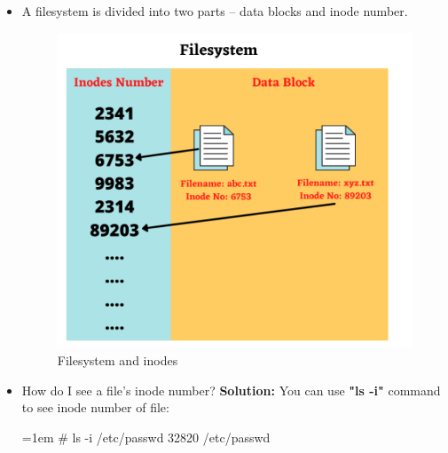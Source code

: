 \setlength{\columnsep}{3pt}
\begin{flushleft}
	\begin{itemize}
		\item A filesystem is divided into two parts – data blocks and inode number.
		\begin{figure}[h!]
			\centering
			\includegraphics[scale=.5]{content/chapter10/images/inodes.png}
			\caption{Filesystem and inodes}
			\label{fig:Filesystem_inodes}
		\end{figure}
		\item How do I see a file's inode number?
		\newline
		\textbf{Solution:} You can use \textbf{"ls -i"} command to see inode number of file:
		\bigskip
		\begin{tcolorbox}[breakable,notitle,boxrule=-0pt,colback=black,colframe=black]
			\color{green}
			\font=1em
			\# ls -i /etc/passwd
			\newline
			\color{white}
			32820 /etc/passwd
			\font=4pt
		\end{tcolorbox}
		

	\end{itemize}	
\end{flushleft}
\newpage


